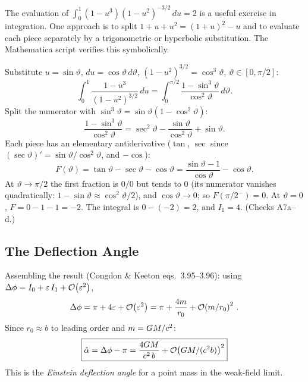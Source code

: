 \begin{remark}
The evaluation of $\int_0^1 (1-u^3)(1-u^2)^{-3/2}\, du = 2$ is a useful
exercise in integration.  One approach is to split
$1 + u + u^2 = (1 + u)^2 - u$ and to evaluate each piece separately by a
trigonometric or hyperbolic substitution.  The Mathematica script verifies
this symbolically.
\end{remark}


\begin{derivation}[The bare integral $=2$ by hand]
Substitute $u = \sin\vartheta$, $du = \cos\vartheta\,d\vartheta$,
$(1-u^2)^{3/2} = \cos^3\vartheta$, $\vartheta \in [0,\pi/2]$:
\[
    \int_0^1 \frac{1-u^3}{(1-u^2)^{3/2}}\,du
    = \int_0^{\pi/2} \frac{1 - \sin^3\vartheta}{\cos^2\vartheta}\,d\vartheta .
\]
Split the numerator with $\sin^3\vartheta = \sin\vartheta(1-\cos^2\vartheta)$:
\[
    \frac{1-\sin^3\vartheta}{\cos^2\vartheta}
    = \sec^2\vartheta - \frac{\sin\vartheta}{\cos^2\vartheta} + \sin\vartheta .
\]
Each piece has an elementary antiderivative ($\tan$, $\sec$ since
$(\sec\vartheta)' = \sin\vartheta/\cos^2\vartheta$, and $-\cos$):
\[
    F(\vartheta) = \tan\vartheta - \sec\vartheta - \cos\vartheta
    = \frac{\sin\vartheta - 1}{\cos\vartheta} - \cos\vartheta .
\]
At $\vartheta \to \pi/2$ the first fraction is $0/0$ but tends to $0$ (its
numerator vanishes quadratically: $1-\sin\vartheta \approx \cos^2\vartheta/2$),
and $\cos\vartheta \to 0$; so $F(\pi/2^-) = 0$.  At $\vartheta = 0$,
$F = 0 - 1 - 1 = -2$.  The integral is $0 - (-2) = 2$, and $I_1 = 4$.
(Checks A7a--d.)
\end{derivation}
\subsection{The Deflection Angle}
\label{sec:deflection_result}

Assembling the result (Congdon \& Keeton eqs.~3.95--3.96): using
$\Delta\phi = I_0 + \varepsilon\, I_1 + \mathcal{O}\!\left(\varepsilon^2\right)$,
\begin{equation}
    \Delta\phi = \pi + 4\varepsilon + \mathcal{O}\!\left(\varepsilon^2\right)
    = \pi + \frac{4m}{r_0} + \mathcal{O}\!\left(m/r_0\right)^2 \,.
    \label{eq:delta_phi_result}
\end{equation}
Since $r_0 \approx b$ to leading order and $m = G M / c^2$:
\begin{equation}
    \boxed{
    \hat{\alpha} = \Delta\phi - \pi
    = \frac{4G M}{c^2\, b}
    + \mathcal{O}\!\left(G M / (c^2 b)\right)^2
    }
    \label{eq:alphahat_result}
\end{equation}
This is the \emph{Einstein deflection angle} for a point mass in the
weak-field limit.



